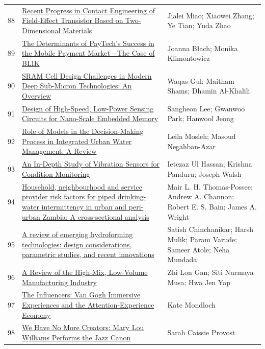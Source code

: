 \documentclass[11pt]{article}
\begin{document}
\begin{longtable}{cp{8cm}p{5cm}}
  88 & \href{https://www.mdpi.com/2079-4991/12/21/3845}{Recent Progress in Contact Engineering of Field-Effect Transistor Based on Two-Dimensional Materials} & Jialei Miao; Xiaowei Zhang; Ye Tian; Yuda Zhao \\
  89 & \href{https://www.mdpi.com/1911-8074/14/9/422}{The Determinants of PayTech's Success in the Mobile Payment Market—The Case of BLIK} & Joanna Błach; Monika Klimontowicz \\
  90 & \href{https://www.mdpi.com/2072-666X/13/8/1332}{SRAM Cell Design Challenges in Modern Deep Sub-Micron Technologies: An Overview} & Waqas Gul; Maitham Shams; Dhamin Al-Khalili \\
  91 & \href{https://www.mdpi.com/1424-8220/24/1/16}{Design of High-Speed, Low-Power Sensing Circuits for Nano-Scale Embedded Memory} & Sangheon Lee; Gwanwoo Park; Hanwool Jeong \\
  92 & \href{https://www.mdpi.com/2073-4441/13/9/1252}{Role of Models in the Decision-Making Process in Integrated Urban Water Management: A Review} & Leila Mosleh; Masoud Negahban-Azar \\
  93 & \href{https://www.mdpi.com/1424-8220/24/3/740}{An In-Depth Study of Vibration Sensors for Condition Monitoring} & Ietezaz Ul Hassan; Krishna Panduru; Joseph Walsh \\
  94 & \href{https://journals.plos.org/water/article?id=10.1371/journal.pwat.0000127}{Household, neighbourhood and service provider risk factors for piped drinking-water intermittency in urban and peri-urban Zambia: A cross-sectional analysis} & Mair L. H. Thomas-Possee; Andrew A. Channon; Robert E. S. Bain; James A. Wright \\
  95 & \href{https://jeas.springeropen.com/articles/10.1186/s44147-024-00546-z}{A review of emerging hydroforming technologies: design considerations, parametric studies, and recent innovations} & Satish Chinchanikar; Harsh Mulik; Param Varude; Sameer Atole; Neha Mundada \\
  96 & \href{https://www.mdpi.com/2076-3417/13/3/1687}{A Review of the High-Mix, Low-Volume Manufacturing Industry} & Zhi Lon Gan; Siti Nurmaya Musa; Hwa Jen Yap \\
  97 & \href{https://www.mdpi.com/2076-0752/11/5/90}{The Influencers: Van Gogh Immersive Experiences and the Attention-Experience Economy} & Kate Mondloch \\
  98 & \href{https://jjs.libraries.rutgers.edu/index.php/jjs/article/view/289}{We Have No More Creators: Mary Lou Williams Performs the Jazz Canon} & Sarah Caissie Provost \\

\end{longtable}
\end{document}
